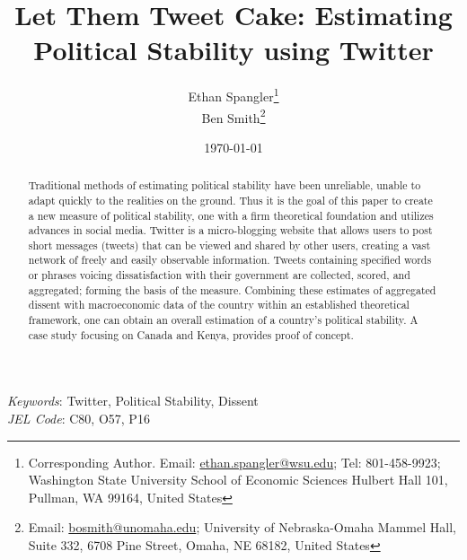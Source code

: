 \documentclass[12pt]{article}
\begin{document}
  


\begin{titlepage}




\title{Let Them Tweet Cake: Estimating Political Stability using Twitter}



\author{Ethan Spangler\thanks{Corresponding Author. Email: {\href{mailto:ethan.spangler@wsu.edu}{ethan.spangler@wsu.edu}}; Tel: 801-458-9923; Washington State University School of Economic Sciences Hulbert Hall 101, Pullman, WA 99164, United States}  \\
Ben Smith\thanks{Email: {\href{mailto:bosmith@unomaha.edu}{bosmith@unomaha.edu}}; University of Nebraska-Omaha Mammel Hall, Suite 332, 6708 Pine Street, Omaha, NE 68182, United States}}



\date{\today}

\maketitle

\begin{abstract}
\noindent Traditional methods of estimating political stability have been unreliable, unable to adapt quickly to the realities on the ground. Thus it is the goal of this paper to create a new measure of political stability, one with a firm theoretical foundation and utilizes advances in social media. Twitter is a micro-blogging website that allows users to post short messages (tweets) that can be viewed and shared by other users, creating a vast network of freely and easily observable information. Tweets containing specified words or phrases voicing dissatisfaction with their government are collected, scored, and aggregated; forming the basis of the measure. Combining these estimates of aggregated dissent with macroeconomic data of the country within an established theoretical framework, one can obtain an overall estimation of a country's political stability. A case study focusing on Canada and Kenya, provides proof of concept.
\end{abstract}

\noindent \textit{Keywords}: Twitter, Political Stability, Dissent \\

\noindent \textit{JEL Code}: C80, O57, P16




\end{titlepage}
\end{document}
